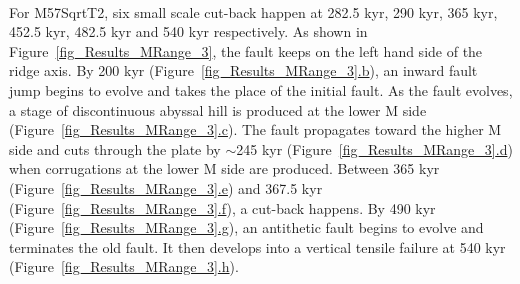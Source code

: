 ~\\
For M57SqrtT2, six small scale cut-back happen at 282.5 kyr, 290 kyr, 365 kyr, 452.5 kyr, 482.5 kyr and 540 kyr respectively. As shown in Figure~\hyperref[fig_Results_MRange_3]{\ref{fig_Results_MRange_3}}, the fault keeps on the left hand side of the ridge axis. By 200 kyr (Figure~\hyperref[fig_Results_MRange_3]{\ref{fig_Results_MRange_3}.b}), an inward fault jump begins to evolve and takes the place of the initial fault. As the fault evolves, a stage of discontinuous abyssal hill is produced at the lower M side (Figure~\hyperref[fig_Results_MRange_3]{\ref{fig_Results_MRange_3}.c}). The fault propagates toward the higher M side and cuts through the plate by $\sim$245 kyr (Figure~\hyperref[fig_Results_MRange_3]{\ref{fig_Results_MRange_3}.d}) when corrugations at the lower M side are produced. Between 365 kyr (Figure~\hyperref[fig_Results_MRange_3]{\ref{fig_Results_MRange_3}.e}) and 367.5 kyr (Figure~\hyperref[fig_Results_MRange_3]{\ref{fig_Results_MRange_3}.f}), a cut-back happens. By 490 kyr (Figure~\hyperref[fig_Results_MRange_3]{\ref{fig_Results_MRange_3}.g}), an antithetic fault begins to evolve and terminates the old fault. It then develops into a vertical tensile failure at 540 kyr (Figure~\hyperref[fig_Results_MRange_3]{\ref{fig_Results_MRange_3}.h}). 
